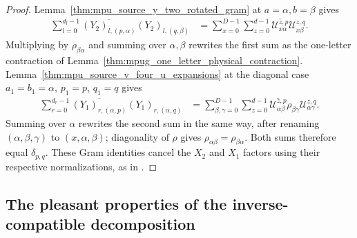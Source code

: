 \begin{proof}\leanok
    Lemma~\ref{thm:mpu_source_y_two_rotated_gram} at $a=\alpha,b=\beta$
    gives
    \begin{align}
        \sum_{l=0}^{d_l-1}\overline{(Y_2)_{l,(p,\alpha)}}(Y_2)_{l,(q,\beta)}
         & =\sum_{x=0}^{D-1}\sum_{z=0}^{d-1}
        \overline{\mathcal U^{z,p}_{x\alpha}}\mathcal U^{z,q}_{x\beta}.
    \end{align}
    Multiplying by $\rho_{\beta\alpha}$ and summing over $\alpha,\beta$
    rewrites the first sum as the one-letter contraction of
    Lemma~\ref{thm:mpug_one_letter_physical_contraction}. Lemma~\ref{thm:mpu_source_v_four_u_expansions}
    at the diagonal case $a_1=b_1=\alpha$, $p_1=p$, $q_1=q$ gives
    \begin{align}
        \sum_{r=0}^{d_r-1}\overline{(Y_1)_{r,(\alpha,p)}}(Y_1)_{r,(\alpha,q)}
         & =\sum_{\beta,\gamma=0}^{D-1}\sum_{z=0}^{d-1}
        \overline{\mathcal U^{z,p}_{\alpha\beta}}\rho_{\beta\gamma}
        \mathcal U^{z,q}_{\alpha\gamma}.
    \end{align}
    Summing over $\alpha$ rewrites the second sum in the same way, after
    renaming $(\alpha,\beta,\gamma)$ to $(x,\alpha,\beta)$; diagonality of
    $\rho$ gives $\rho_{\alpha\beta}=\rho_{\beta\alpha}$. Both sums
    therefore equal $\delta_{p,q}$. These Gram identities cancel the $X_2$
    and $X_1$ factors using their respective normalizations, as in
    \cite[lines~1030--1050]{FrancoRubio2025MPUGauging}.
\end{proof}

\subsection{The pleasant properties of the inverse-compatible decomposition}

